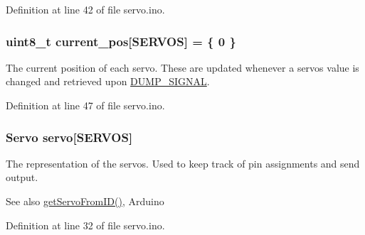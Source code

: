 Definition at line 42 of file servo.\+ino.

\hypertarget{servo_8ino_ae88c6e452cc6a2dc7af59897c42d8e1e}{}
\subsubsection[{current\+\_\+pos}]{\setlength{\rightskip}{0pt plus 5cm}uint8\+\_\+t current\+\_\+pos\mbox{[}{\bf S\+E\+R\+V\+O\+S}\mbox{]} = \{ 0 \}}\label{servo_8ino_ae88c6e452cc6a2dc7af59897c42d8e1e}
The current position of each servo. These are updated whenever a servos value is changed and retrieved upon \hyperlink{servo_8ino_a06fc87d81c62e9abb8790b6e5713c55ba31cd671c80d04a4acc2d8256ec960c90}{D\+U\+M\+P\+\_\+\+S\+I\+G\+N\+A\+L}. 

Definition at line 47 of file servo.\+ino.

\hypertarget{servo_8ino_adf02be48d17da3f4a229ebfdfda2fa71}{}
\subsubsection[{servo}]{\setlength{\rightskip}{0pt plus 5cm}Servo servo\mbox{[}{\bf S\+E\+R\+V\+O\+S}\mbox{]}}\label{servo_8ino_adf02be48d17da3f4a229ebfdfda2fa71}
The representation of the servos. Used to keep track of pin assignments and send output. \begin{DoxySeeAlso}{See also}
\hyperlink{rhand_8h_a13edec01163cd92d516634c36fe06aeb}{get\+Servo\+From\+I\+D()}, Arduino 
\end{DoxySeeAlso}


Definition at line 32 of file servo.\+ino.

